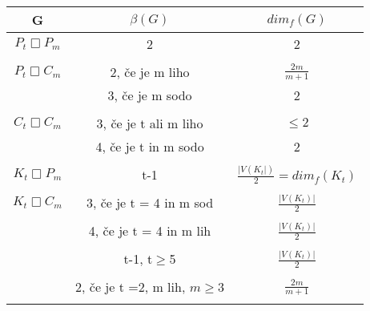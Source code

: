 \documentclass[a4paper]{report}
\begin{document}
	\begin{center}
		\begin{tabular}{ ||c|c|c|| }
			\hline
			G  & $\beta(G)$& $dim_{f}(G)$\\
			\hline
			$P_{t} \Box P_{m} $ & 2& 2 \\
			\hline
			&&\\
			$P_{t} \Box C_{m} $& 2, če je m liho& $ \frac{2m}{m+1}$\\
			& 3, če je m sodo& 2\\
			\hline
			&&\\
			$C_{t} \Box  C_{m}$ & 3, če je t ali m liho& $\le 2 $\\
			&4, če je t in m sodo& 2\\
			\hline
			&&\\
			$K_{t} \Box P_{m}$& t-1 &$\frac{|V(K_{t}|)}{2} = dim_{f}(K_{t})$\\
			\hline
			&&\\
			$K_{t} \Box C_{m}$ & 3, če je t = 4 in m sod& $\frac{|V(K_{t})|}{2}$\\
			&&\\
			&4, če je t = 4 in m lih& $\frac{|V(K_{t})|}{2}$\\
			&&\\
			& t-1, t$\ge$5 &$\frac{|V(K_{t})|}{2}$\\
			&&\\
			&2, če je t =2, m lih, $m\ge 3$ &$\frac{2m}{m+1}$\\
			&&\\
			\hline
			
			\hline
			
		\end{tabular}
	\end{center}
	\newpage
\end{document}

